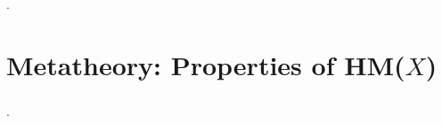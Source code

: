 \documentclass[aspectratio=169]{beamer}
\begin{document}
\begin{frame}[fragile]
  \frametitle{}
  \begin{block}{}
    \begin{center}
      .
    \end{center}
  \end{block}
\end{frame}

\section{Metatheory: Properties of HM($X$)}

\begin{frame}[fragile]
  \frametitle{}
  \begin{block}{}
    \begin{center}
      .
    \end{center}
  \end{block}
\end{frame}
\end{document}
